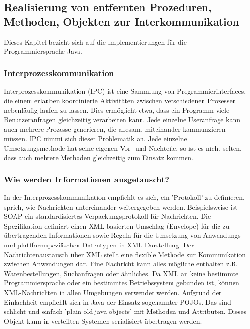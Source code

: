 \documentclass[letterpaper, 12pt]{article}
\let\tempsubsection\subsection
\renewcommand\subsection[1]{\vspace{0cm}\tempsubsection{#1}\vspace{0cm}}
\let\tempsubsubsection\subsubsection
\renewcommand\subsubsection[1]{\vspace{0cm}\tempsubsubsection{#1}\vspace{0cm}}
\begin{document}
\subsection{Realisierung von entfernten Prozeduren, Methoden, Objekten zur Interkommunikation}

Dieses Kapitel bezieht sich auf die Implementierungen für die Programmiersprache Java.

\subsubsection{Interprozesskommunikation}

Interprozesskommunikation (IPC) ist eine Sammlung von Programmierinterfaces, die einem erlauben koordinierte Aktivitäten zwischen verschiedenen Prozessen nebenläufig laufen zu lassen. Dies ermöglicht etwa, dass ein Programm viele Benutzeranfragen gleichzeitig verarbeiten kann. Jede einzelne Useranfrage kann auch mehrere Prozesse generieren, die allesamt miteinander kommunzieren müssen. IPC nimmt sich dieser Problematik an. Jede einzelne Umsetzungsmethode hat seine eigenen Vor- und Nachteile, so ist es nicht selten, dass auch mehrere Methoden gleichzeitig zum Einsatz kommen. \cite{ipc}

\subsubsection{Wie werden Informationen ausgetauscht?}

In der Interprozesskommunikation empfiehlt es sich, ein 'Protokoll' zu definieren, sprich, wie Nachrichten untereinander weitergegeben werden. Beispielsweise ist SOAP ein standardisiertes Verpackungsprotokoll für Nachrichten. Die Spezifikation definiert einen XML-basierten Umschlag (Envelope) für die zu übertragenden Informationen sowie Regeln für die Umsetzung von Anwendungs- und plattformspezifischen Datentypen in XML-Darstellung. Der Nachrichtenaustausch über XML stellt eine flexible Methode zur Kommunikation zwischen Anwendungen dar. Eine Nachricht kann alles mögliche enthalten z.B. Warenbestellungen, Suchanfragen oder ähnliches. Da XML an keine bestimmte Programmiersprache oder ein bestimmtes Betriebssystem gebunden ist, können XML-Nachrichten in allen Umgebungen verwendet werden. Aufgrund der Einfachheit empfiehlt sich in Java der Einsatz sogenannter POJOs. Das sind schlicht und einfach 'plain old java objects' mit Methoden und Attributen. Dieses Objekt kann in verteilten Systemen serialisiert übertragen werden. \cite{ausarbeitungsoa}
\end{document}
